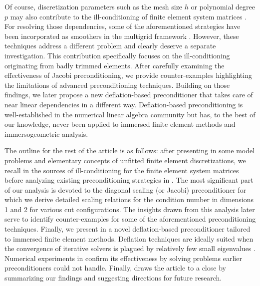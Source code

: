 \documentclass{article}
\numberwithin{equation}{section}
\theoremstyle{definition}
\begin{document}
Of course, discretization parameters such as the mesh size $h$ or polynomial degree $p$ may also contribute to the ill-conditioning of finite element system matrices \cite{gahalaut2012condition,gervasio2020computational}. For resolving those dependencies, some of the aforementioned strategies have been incorporated as smoothers in the multigrid framework \cite{de2020multigrid,jomo2021hierarchical}. However, these techniques address a different problem and clearly deserve a separate investigation. This contribution specifically focuses on the ill-conditioning originating from badly trimmed elements. After carefully examining the effectiveness of Jacobi preconditioning, we provide counter-examples highlighting the limitations of advanced preconditioning techniques. Building on those findings, we later propose a new deflation-based preconditioner that takes care of near linear dependencies in a different way. Deflation-based preconditioning is well-established in the numerical linear algebra community \cite{vuik1999efficient,frank2001construction,vermolen2004deflation,dwarka2022scalable} but has, to the best of our knowledge, never been applied to immersed finite element methods and immersogeometric analysis.

The outline for the rest of the article is as follows: after presenting in  some model problems and elementary concepts of unfitted finite element discretizations, we recall in  the sources of ill-conditioning for the finite element system matrices before analyzing existing preconditioning strategies in . The most significant part of our analysis is devoted to the diagonal scaling (or Jacobi) preconditioner for which we derive detailed scaling relations for the condition number in dimensions 1 and 2 for various cut configurations. The insights drawn from this analysis later serve to identify counter-examples for some of the aforementioned preconditioning techniques. Finally, we present in  a novel deflation-based preconditioner tailored to immersed finite element methods. Deflation techniques are ideally suited when the convergence of iterative solvers is plagued by relatively few small eigenvalues \cite{vuik1999efficient}. Numerical experiments in  confirm its effectiveness by solving problems earlier preconditioners could not handle. Finally,  draws the article to a close by summarizing our findings and suggesting directions for future research.
\end{document}
